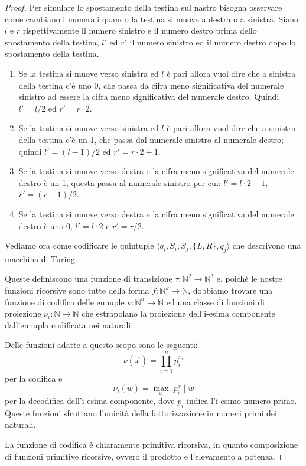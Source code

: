 \begin{proof}
Per simulare lo spostamento della testina sul nastro bisogna osservare come
cambiano i numerali quando la testina si muove a destra o a sinistra. Siano $l$
e $r$ rispettivamente il numero sinistro e il numero destro prima dello
spostamento della testina, $l'$ ed $r'$ il numero sinistro ed il numero destro
dopo lo spostamento della testina.
\begin{enumerate}
 \item Se la testina si muove verso sinistra ed $l$ è pari allora vuol
   dire che a sinistra della testina c'è uno 0, che passa da cifra
   meno significativa del numerale sinistro ad essere la cifra meno
   significativa del numerale destro.  Quindi $l' = l/2$ ed $r' = r
   \cdot 2$.
 \item Se la testina si muove verso sinistra ed $l$ è pari allora vuol
   dire che a sinistra della testina c'è un 1, che passa dal numerale
   sinistro al numerale destro; quindi $l' = (l-1)/2$ ed $r' = r \cdot
   2 + 1$.
 \item Se la testina si muove verso destra e la cifra meno
   significativa del numerale destro è un 1, questa passa al numerale
   sinistro per cui: $l' = l \cdot 2 + 1$, $r' = (r-1)/2$.
 \item Se la testina si muove verso destra e la cifra meno
   significativa del numerale destro è uno 0, $l' = l \cdot 2$ e $r' =
   r/2$.
\end{enumerate}

Vediamo ora come codificare le quintuple $\langle q_i, S_i, S_j,
\{L,R\}, q_j \rangle$ che descrivono una macchina di Turing.

Queste definiscono una funzione di transizione $\tau : \mathbb{N}^2
\rightarrow \mathbb{N}^3$ e, poichè le nostre funzioni ricorsive sono
tutte della forma $f:\mathbb{N}^k \rightarrow \mathbb{N}$, dobbiamo
trovare una funzione di codifica delle ennuple $\nu: \mathbb{N}^n
\rightarrow \mathbb{N}$ ed una classe di funzioni di proiezione
$\nu_i: \mathbb{N} \rightarrow \mathbb{N}$ che estrapolano la
proiezione dell'i-esima componente dall'ennupla codificata nei
naturali.

Delle funzioni adatte a questo scopo sono le seguenti:
$$\nu(\vec{x}) = \prod_{i=1}^n p_i^{x_i}$$ per la codifica
e $$\nu_i(w) = \max_x.p_i^x \mid w$$ per la decodifica dell'i-esima
componente, dove $p_i$ indica l'i-esimo numero primo. Queste funzioni
sfruttano l'unicità della fattorizzazione in numeri primi dei
naturali.

La funzione di codifica è chiaramente primitiva ricorsiva, in quanto
composizione di funzioni primitive ricorsive, ovvero il prodotto e
l'elevamento a potenza.


\end{proof}
